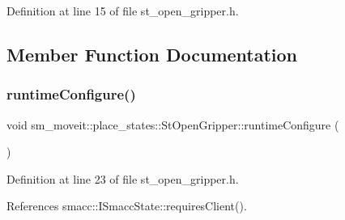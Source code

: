 Definition at line 15 of file st\+\_\+open\+\_\+gripper.\+h.



\subsection{Member Function Documentation}
\mbox{\label{structsm__moveit_1_1place__states_1_1StOpenGripper_a49b45992f2ff9a5f1435b14eab1f2621}} 
\subsubsection{\texorpdfstring{runtime\+Configure()}{runtimeConfigure()}}
{\footnotesize\ttfamily void sm\+\_\+moveit\+::place\+\_\+states\+::\+St\+Open\+Gripper\+::runtime\+Configure (\begin{DoxyParamCaption}{ }\end{DoxyParamCaption})\hspace{0.3cm}{\ttfamily [inline]}}



Definition at line 23 of file st\+\_\+open\+\_\+gripper.\+h.



References smacc\+::\+I\+Smacc\+State\+::requires\+Client().


